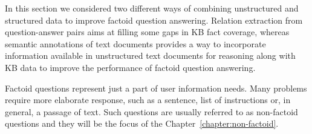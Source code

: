 In this section we considered two different ways of combining unstructured and structured data to improve factoid question answering.
Relation extraction from question-answer pairs aims at filling some gaps in KB fact coverage, whereas semantic annotations of text documents provides a way to incorporate information available in unstructured text documents for reasoning along with KB data to improve the performance of factoid question answering.

Factoid questions represent just a part of user information needs. Many problems require more elaborate response, such as a sentence, list of instructions or, in general, a passage of text.
Such questions are usually referred to as non-factoid questions and they will be the focus of the Chapter~\ref{chapter:non-factoid}.